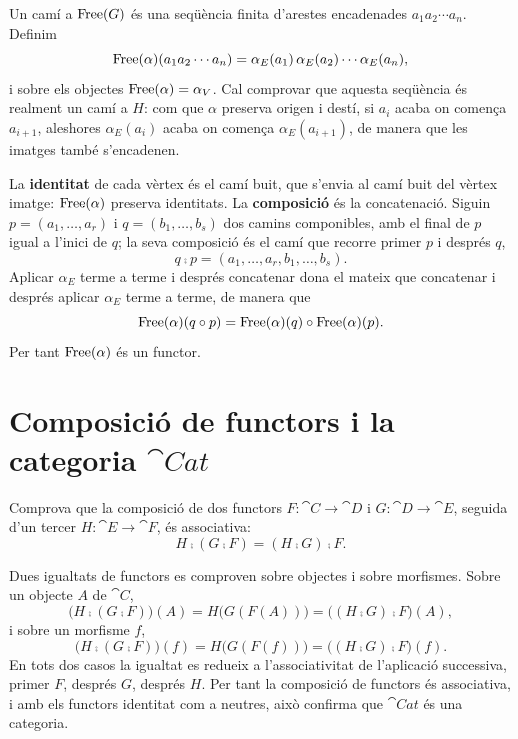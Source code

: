\begin{solucio}
Un camí a $\operatorname{Free}(G)$ és una seqüència finita d'arestes encadenades $a_1a_2\cdots a_n$. Definim
\[
\operatorname{Free}(\alpha)(a_1a_2\cdots a_n)=\alpha_E(a_1)\,\alpha_E(a_2)\cdots\alpha_E(a_n),
\]
i sobre els objectes $\operatorname{Free}(\alpha)=\alpha_V$. Cal comprovar que aquesta seqüència és realment un camí a $H$: com que $\alpha$ preserva origen i destí, si $a_i$ acaba on comença $a_{i+1}$, aleshores $\alpha_E(a_i)$ acaba on comença $\alpha_E(a_{i+1})$, de manera que les imatges també s'encadenen.

La \textbf{identitat} de cada vèrtex és el camí buit, que s'envia al camí buit del vèrtex imatge: $\operatorname{Free}(\alpha)$ preserva identitats. La \textbf{composició} és la concatenació. Siguin $p=(a_1,\dots,a_r)$ i $q=(b_1,\dots,b_s)$ dos camins componibles, amb el final de $p$ igual a l'inici de $q$; la seva composició és el camí que recorre primer $p$ i després $q$,
\[
q\comp p=(a_1,\dots,a_r,b_1,\dots,b_s).
\]
Aplicar $\alpha_E$ terme a terme i després concatenar dona el mateix que concatenar i després aplicar $\alpha_E$ terme a terme, de manera que
\[
\operatorname{Free}(\alpha)(q\circ p)=\operatorname{Free}(\alpha)(q)\circ\operatorname{Free}(\alpha)(p).
\]
Per tant $\operatorname{Free}(\alpha)$ és un functor.
\end{solucio}

\section{Composició de functors i la categoria \texorpdfstring{$\cat{Cat}$}{Cat}}

\begin{exercici}
Comprova que la composició de dos functors $F\colon\cat{C}\to\cat{D}$ i $G\colon\cat{D}\to\cat{E}$, seguida d'un tercer $H\colon\cat{E}\to\cat{F}$, és associativa:
\[
H\comp(G\comp F)=(H\comp G)\comp F.
\]
\end{exercici}

\begin{solucio}
Dues igualtats de functors es comproven sobre objectes i sobre morfismes. Sobre un objecte $A$ de $\cat{C}$,
\[
\big(H\comp(G\comp F)\big)(A)=H\big(G(F(A))\big)=\big((H\comp G)\comp F\big)(A),
\]
i sobre un morfisme $f$,
\[
\big(H\comp(G\comp F)\big)(f)=H\big(G(F(f))\big)=\big((H\comp G)\comp F\big)(f).
\]
En tots dos casos la igualtat es redueix a l'associativitat de l'aplicació successiva, primer $F$, després $G$, després $H$. Per tant la composició de functors és associativa, i amb els functors identitat com a neutres, això confirma que $\cat{Cat}$ és una categoria.
\end{solucio}

